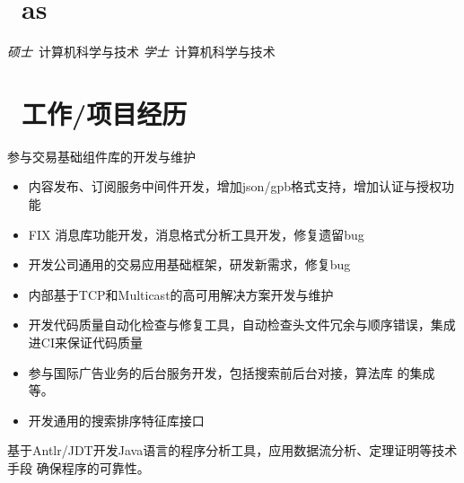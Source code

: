 \documentclass{resume}
\begin{document}



\section{\faGraduationCap\ as}
\textit{硕士}\ 计算机科学与技术
\textit{学士}\ 计算机科学与技术

\section{\faUsers\ 工作/项目经历}

参与交易基础组件库的开发与维护
\begin{itemize}
  \item 内容发布、订阅服务中间件开发，增加json/gpb格式支持，增加认证与授权功能
  \item FIX 消息库功能开发，消息格式分析工具开发，修复遗留bug
  \item 开发公司通用的交易应用基础框架，研发新需求，修复bug
  \item 内部基于TCP和Multicast的高可用解决方案开发与维护
  \item 开发代码质量自动化检查与修复工具，自动检查头文件冗余与顺序错误，集成进CI来保证代码质量
\end{itemize}

\begin{itemize}
  \item 参与国际广告业务的后台服务开发，包括搜索前后台对接，算法库
的集成等。
  \item 开发通用的搜索排序特征库接口
\end{itemize}


基于Antlr/JDT开发Java语言的程序分析工具，应用数据流分析、定理证明等技术手段
确保程序的可靠性。
\end{document}
